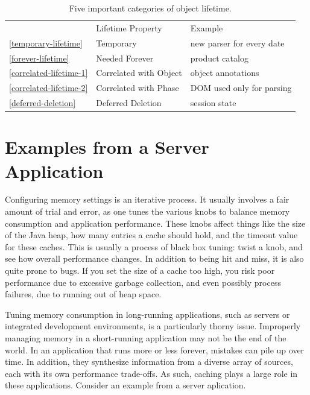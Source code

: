 \begin{table}
\centering
	\begin{tabular}{lp{}p{}}
	\toprule  & Lifetime Property & Example \\ \cmidrule(r){2-2} \cmidrule(l){3-3}
	\autoref{temporary-lifetime}  & {Temporary} & new
	parser for every date
	\\
	\autoref{forever-lifetime} & {Needed Forever} & product catalog
	\\
	\autoref{correlated-lifetime-1} & {Correlated with Object}
	& object annotations
	\\
	\autoref{correlated-lifetime-2} & {Correlated with Phase} &
	DOM used only for parsing
	\\
	\autoref{deferred-deletion} & {Deferred Deletion} &
	session state \\
	\bottomrule
	\end{tabular}
	\caption{Five important categories of object lifetime.}
	\label{tab:five-lifetimes}
\end{table}

\section{Examples from a Server Application}

Configuring memory settings is an iterative process. It usually involves a
fair amount of trial and error, as one tunes the various knobs to balance memory
consumption and application performance. These knobs affect things like the size of the Java
heap, how many entries a cache should hold, and the timeout value for these
caches. This is usually a process of black box tuning: twist a knob, and see
how overall performance changes. In addition to being hit
and miss, it is also quite prone to bugs. If you set the size of a cache too
high, you risk poor performance due to excessive garbage collection, and even
possibly process failures, due to running out of heap space.

Tuning memory consumption in long-running applications, such as servers or
integrated development environments, is a particularly thorny issue. Improperly
managing memory in a short-running application may not be the end of the world.
In an application that runs more or less forever, mistakes can pile up over time.
In addition, they synthesize information from a diverse array of sources, each
with its own performance trade-offs. As such, caching plays a large role in these
applications. Consider an example from a server aplication.

